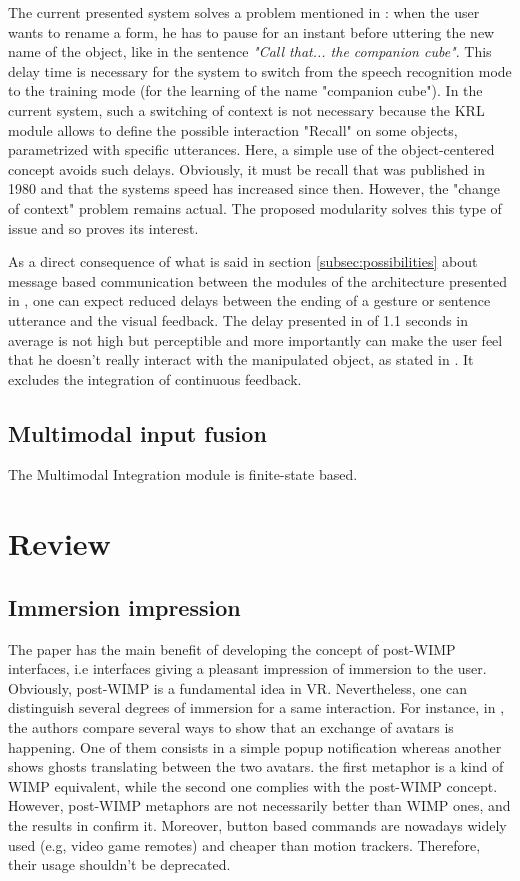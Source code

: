 \documentclass[a4paper]{article}
\begin{document}
The current presented system solves a problem mentioned in \cite{putthatthere}: when the user wants to rename a form, he has to pause for an instant before uttering the new name of the object, like in the sentence \textit{"Call that... the companion cube"}. This delay time is necessary for the system to switch from the speech recognition mode to the training mode (for the learning of the name "companion cube"). In the current system, such a switching of context is not necessary because the KRL module allows to define the possible interaction "Recall" on some objects, parametrized with specific utterances. Here, a simple use of the object-centered concept avoids such delays. Obviously, it must be recall that \cite{putthatthere} was published in 1980 and that the systems speed has increased since then. However, the "change of context" problem remains actual. The proposed modularity solves this type of issue and so proves its interest.

As a direct consequence of what is said in section \ref{subsec:possibilities} about message based communication between the modules of the architecture presented in \cite{kaiser}, one can expect reduced delays between the ending of a gesture or sentence utterance and the visual feedback. The delay presented in \cite{kaiser} of 1.1 seconds in average is not high but perceptible and more importantly can make the user feel that he doesn't really interact with the manipulated object, as stated in \cite{responsetime}. It excludes the integration of continuous feedback.

\subsection{Multimodal input fusion}

The Multimodal Integration module is finite-state based. 

\section{Review}

\subsection{Immersion impression}
The paper has the main benefit of developing the concept of post-WIMP interfaces, i.e interfaces giving a pleasant impression of immersion to the user. Obviously, post-WIMP is a fundamental idea in VR. Nevertheless, one can distinguish several degrees of immersion for a same interaction. For instance, in \cite{avatars}, the authors compare several ways to show that an exchange of avatars is happening. One of them consists in a simple popup notification whereas another shows ghosts translating between the two avatars. the first metaphor is a kind of WIMP equivalent, while the second one complies with the post-WIMP concept. However, post-WIMP metaphors are not necessarily better than WIMP ones, and the results in \cite{avatars} confirm it. Moreover, button based commands are nowadays widely used (e.g, video game remotes) and cheaper than motion trackers. Therefore, their usage shouldn't be deprecated.
\end{document}
